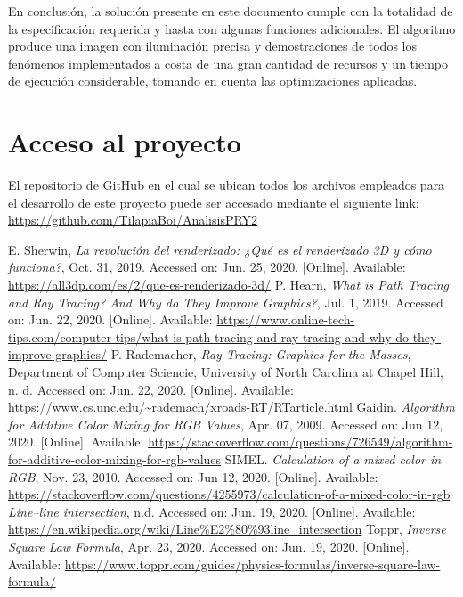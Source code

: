 \documentclass[conference]{IEEEtran}
\begin{document}
En conclusión, la solución presente en este documento cumple con la totalidad de la especificación requerida y hasta con algunas funciones adicionales. El algoritmo produce una imagen con iluminación precisa y demostraciones de todos los fenómenos implementados a costa de una gran cantidad de recursos y un tiempo de ejecución considerable, tomando en cuenta las optimizaciones aplicadas. 

\section{Acceso al proyecto}
El repositorio de GitHub en el cual se ubican todos los archivos empleados para el desarrollo de este proyecto puede ser accesado mediante el siguiente link: \url{https://github.com/TilapiaBoi/AnalisisPRY2}

\begin{thebibliography}{00}
 E. Sherwin, \textit{La revolución del renderizado: ¿Qué es el renderizado 3D y cómo funciona?}, Oct. 31, 2019. Accessed on: Jun. 25, 2020. [Online].  Available: \url{https://all3dp.com/es/2/que-es-renderizado-3d/}
 P. Hearn, \textit{What is Path Tracing and Ray Tracing? And Why do They Improve Graphics?}, Jul. 1, 2019. Accessed on: Jun. 22, 2020. [Online]. Available: \url{https://www.online-tech-tips.com/computer-tips/what-is-path-tracing-and-ray-tracing-and-why-do-they-improve-graphics/}
 P. Rademacher, \textit{Ray Tracing: Graphics for the Masses}, Department of Computer Sciencie, University of North Carolina at Chapel Hill, n. d. Accessed on: Jun. 22, 2020. [Online]. Available: \url{https://www.cs.unc.edu/~rademach/xroads-RT/RTarticle.html}
 Gaidin. \textit{Algorithm for Additive Color Mixing for RGB Values}, Apr. 07, 2009. Accessed on: Jun 12, 2020. [Online]. Available: \url{https://stackoverflow.com/questions/726549/algorithm-for-additive-color-mixing-for-rgb-values}
 SIMEL. \textit{Calculation of a mixed color in RGB}, Nov. 23, 2010. Accessed on: Jun 12, 2020. [Online]. Available: \url{https://stackoverflow.com/questions/4255973/calculation-of-a-mixed-color-in-rgb}
 \textit{Line–line intersection}, n.d. Accessed on: Jun. 19, 2020. [Online]. Available: \url{https://en.wikipedia.org/wiki/Line\%E2\%80\%93line_intersection}
 Toppr, \textit{Inverse Square Law Formula}, Apr. 23, 2020. Accessed on: Jun. 19, 2020. [Online]. Available: \url{https://www.toppr.com/guides/physics-formulas/inverse-square-law-formula/}
\end{thebibliography}
\end{document}
